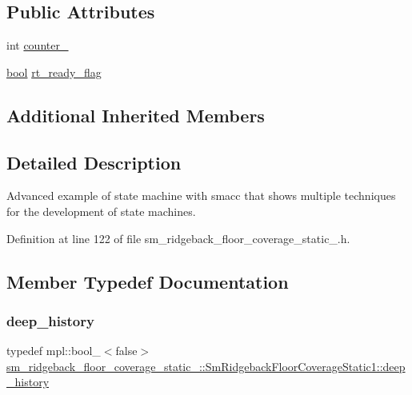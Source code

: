 \subsection*{Public Attributes}
\begin{DoxyCompactItemize}
\item 
int \hyperlink{structsm__ridgeback__floor__coverage__static__1_1_1SmRidgebackFloorCoverageStatic1_a369dd32c8362fc491428cff56a8bd170}{counter\+\_}
\item 
\hyperlink{classbool}{bool} \hyperlink{structsm__ridgeback__floor__coverage__static__1_1_1SmRidgebackFloorCoverageStatic1_a6b31072566a8039b4165b803b8468069}{rt\+\_\+ready\+\_\+flag}
\end{DoxyCompactItemize}
\subsection*{Additional Inherited Members}


\subsection{Detailed Description}
Advanced example of state machine with smacc that shows multiple techniques for the development of state machines. 

Definition at line 122 of file sm\+\_\+ridgeback\+\_\+floor\+\_\+coverage\+\_\+static\+\_.\+h.



\subsection{Member Typedef Documentation}
\mbox{\label{structsm__ridgeback__floor__coverage__static__1_1_1SmRidgebackFloorCoverageStatic1_a6729e53bd607decd77987152aea1f1bc}} 
\subsubsection{\texorpdfstring{deep\+\_\+history}{deep\_history}}
{\footnotesize\ttfamily typedef mpl\+::bool\+\_\+$<$false$>$ \hyperlink{structsm__ridgeback__floor__coverage__static__1_1_1SmRidgebackFloorCoverageStatic1_a6729e53bd607decd77987152aea1f1bc}{sm\+\_\+ridgeback\+\_\+floor\+\_\+coverage\+\_\+static\+\_\+::\+Sm\+Ridgeback\+Floor\+Coverage\+Static1\+::deep\+\_\+history}}



